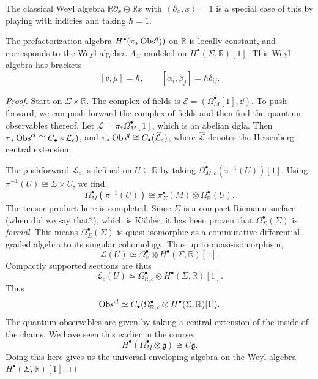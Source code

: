 The classical Weyl algebra $\mathbb{R} \partial _x \oplus \mathbb{R} x$ with $\left\langle \partial _x,x \right\rangle =1$ is a special case of this by playing with indicies and taking $\hbar =1$.

\begin{proposition}\label{prp:7.2.1}
	The prefactorization algebra $H^{\bullet} (\pi _*\operatorname{Obs}^q))$ on $\mathbb{R} $ is locally constant, and corresponds to the Weyl algebra $A_\Sigma $ modeled on $H^{\bullet} (\Sigma ,\mathbb{R} )[1]$. This Weyl algebra has brackets
	\[
		[v,\mu ]=\hbar ,\qquad [\alpha _i,\beta _j]=\hbar \delta _{ij} 
	.\]
\end{proposition}
\begin{proof}
	Start on $\Sigma \times \mathbb{R} $. The complex of fields is $\mathcal{E} =(\Omega ^{\bullet} _M[1],\dd)$. To push forward, we can push forward the complex of fields and then find the quantum observables thereof. Let $\mathcal{L} =\pi _*\Omega ^{\bullet} _M[1]$, which is an abelian dgla. Then $\pi _*\operatorname{Obs}^{cl} \cong C_{\bullet} *\mathcal{L} _c)$, and $\pi _*\operatorname{Obs}^q \cong C_{\bullet} (\widehat{\mathcal{L} } _c)$, where $\widehat{\mathcal{L} } $ denotes the Heisenberg central extension.

	The pushforward $\mathcal{L} _c$ is defined on $U\subseteq \mathbb{R} $ by taking $\Omega _{M,c}^{\bullet} (\pi ^{-1} (U))[1]$. Using $\pi ^{-1} (U) \cong \Sigma \times U$, we find
	\[
		\Omega ^{\bullet}_{M} (\pi ^{-1} (U))\cong \pi ^{\bullet} _{\Sigma } (M) \otimes \Omega ^{\bullet} _{\mathbb{R} } (U)
	.\]
	The tensor product here is completed. Since $\Sigma $ is a compact Riemann surface (when did we say that?), which is K\"ahler, it has been proven that $\Omega ^{\bullet} _{\Sigma } (\Sigma )$ is \emph{formal}. This means $\Omega ^{\bullet}_{\Sigma } (\Sigma )$ is quasi-isomorphic as a commutative differential graded algebra to its singular cohomology. Thus up to quasi-isomorphism,
	\[
		\mathcal{L} (U) \simeq \Omega ^{\bullet} _{\mathbb{R} } \otimes H^{\bullet}(\Sigma,\mathbb{R}  )[1]
	.\]
	Compactly supported sections are thus
	\[
		\mathcal{L} _c(U) \simeq \Omega ^{\bullet} _{\mathbb{R} ,c} \otimes H^{\bullet} (\Sigma ,\mathbb{R} )[1]
	.\]
	Thus
	\[
		\operatorname{Obs}^{cl} \simeq C_{\bullet} (\Omega ^{\bullet} _{\mathbb{R} ,c} \otimes H^{\bullet} (\Sigma ,\mathbb{R} )[1])
	.\]
	The quantum observables are given by taking a central extension of the inside of the chains. We have seen this earlier in the course:
	\[
		H^{\bullet} (\Omega ^{\bullet} _M \otimes \mathfrak{g} )\cong U\mathfrak{g} 
	.\]
	Doing this here gives us the universal enveloping algebra on the Weyl algebra $H^{\bullet} (\Sigma ,\mathbb{R} )[1]$.
\end{proof}

